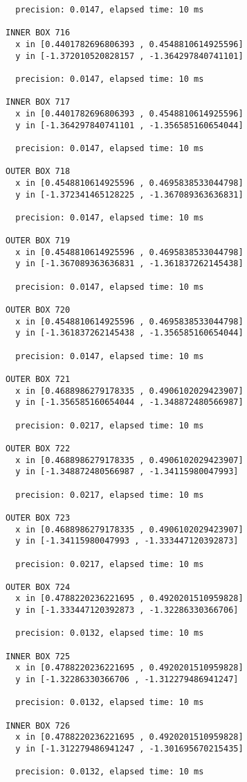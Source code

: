 \begin{verbatim}
  precision: 0.0147, elapsed time: 10 ms

INNER BOX 716
  x in [0.4401782696806393 , 0.4548810614925596]
  y in [-1.372010520828157 , -1.364297840741101]

  precision: 0.0147, elapsed time: 10 ms

INNER BOX 717
  x in [0.4401782696806393 , 0.4548810614925596]
  y in [-1.364297840741101 , -1.356585160654044]

  precision: 0.0147, elapsed time: 10 ms

OUTER BOX 718
  x in [0.4548810614925596 , 0.4695838533044798]
  y in [-1.372341465128225 , -1.367089363636831]

  precision: 0.0147, elapsed time: 10 ms

OUTER BOX 719
  x in [0.4548810614925596 , 0.4695838533044798]
  y in [-1.367089363636831 , -1.361837262145438]

  precision: 0.0147, elapsed time: 10 ms

OUTER BOX 720
  x in [0.4548810614925596 , 0.4695838533044798]
  y in [-1.361837262145438 , -1.356585160654044]

  precision: 0.0147, elapsed time: 10 ms

OUTER BOX 721
  x in [0.4688986279178335 , 0.4906102029423907]
  y in [-1.356585160654044 , -1.348872480566987]

  precision: 0.0217, elapsed time: 10 ms

OUTER BOX 722
  x in [0.4688986279178335 , 0.4906102029423907]
  y in [-1.348872480566987 , -1.34115980047993]

  precision: 0.0217, elapsed time: 10 ms

OUTER BOX 723
  x in [0.4688986279178335 , 0.4906102029423907]
  y in [-1.34115980047993 , -1.333447120392873]

  precision: 0.0217, elapsed time: 10 ms

OUTER BOX 724
  x in [0.4788220236221695 , 0.4920201510959828]
  y in [-1.333447120392873 , -1.32286330366706]

  precision: 0.0132, elapsed time: 10 ms

INNER BOX 725
  x in [0.4788220236221695 , 0.4920201510959828]
  y in [-1.32286330366706 , -1.312279486941247]

  precision: 0.0132, elapsed time: 10 ms

INNER BOX 726
  x in [0.4788220236221695 , 0.4920201510959828]
  y in [-1.312279486941247 , -1.301695670215435]

  precision: 0.0132, elapsed time: 10 ms


\end{verbatim}
